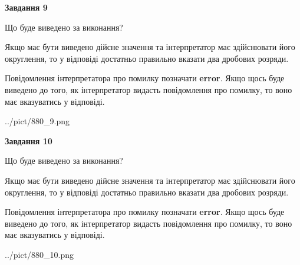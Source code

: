 \documentclass[12pt, ukrainian]{article}
\begin{document}
{\begin {Large}
{\begin {center}\textbf{Завдання 9}\end {center}}\par
Що буде виведено за виконання? \par

Якщо має бути виведено дійсне значення та інтерпретатор має здійснювати його округлення, 
то у відповіді достатньо правильно вказати два дробових розряди.

Повідомлення інтерпретатора про помилку позначати \textbf{error}.
Якщо щось буде виведено до того, як інтерпретатор видасть повідомлення про помилку, 
то воно має вказуватись у відповіді. \par

\begin{center}
	{../pict/880_9.png}
\end{center}
\newpage

{\begin {center}\textbf{Завдання 10}\end {center}}\par
Що буде виведено за виконання? \par

Якщо має бути виведено дійсне значення та інтерпретатор має здійснювати його округлення, 
то у відповіді достатньо правильно вказати два дробових розряди.

Повідомлення інтерпретатора про помилку позначати \textbf{error}.
Якщо щось буде виведено до того, як інтерпретатор видасть повідомлення про помилку, 
то воно має вказуватись у відповіді. \par

\begin{center}
	{../pict/880_10.png}
\end{center}
\newpage

\end {Large}}
\end{document}
